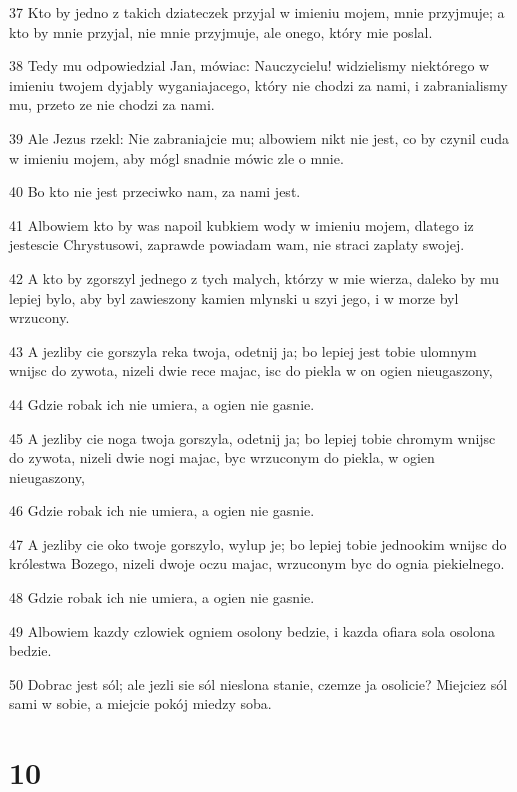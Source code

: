 \par 37 Kto by jedno z takich dziateczek przyjal w imieniu mojem, mnie przyjmuje; a kto by mnie przyjal, nie mnie przyjmuje, ale onego, który mie poslal.
\par 38 Tedy mu odpowiedzial Jan, mówiac: Nauczycielu! widzielismy niektórego w imieniu twojem dyjably wyganiajacego, który nie chodzi za nami, i zabranialismy mu, przeto ze nie chodzi za nami.
\par 39 Ale Jezus rzekl: Nie zabraniajcie mu; albowiem nikt nie jest, co by czynil cuda w imieniu mojem, aby mógl snadnie mówic zle o mnie.
\par 40 Bo kto nie jest przeciwko nam, za nami jest.
\par 41 Albowiem kto by was napoil kubkiem wody w imieniu mojem, dlatego iz jestescie Chrystusowi, zaprawde powiadam wam, nie straci zaplaty swojej.
\par 42 A kto by zgorszyl jednego z tych malych, którzy w mie wierza, daleko by mu lepiej bylo, aby byl zawieszony kamien mlynski u szyi jego, i w morze byl wrzucony.
\par 43 A jezliby cie gorszyla reka twoja, odetnij ja; bo lepiej jest tobie ulomnym wnijsc do zywota, nizeli dwie rece majac, isc do piekla w on ogien nieugaszony,
\par 44 Gdzie robak ich nie umiera, a ogien nie gasnie.
\par 45 A jezliby cie noga twoja gorszyla, odetnij ja; bo lepiej tobie chromym wnijsc do zywota, nizeli dwie nogi majac, byc wrzuconym do piekla, w ogien nieugaszony,
\par 46 Gdzie robak ich nie umiera, a ogien nie gasnie.
\par 47 A jezliby cie oko twoje gorszylo, wylup je; bo lepiej tobie jednookim wnijsc do królestwa Bozego, nizeli dwoje oczu majac, wrzuconym byc do ognia piekielnego.
\par 48 Gdzie robak ich nie umiera, a ogien nie gasnie.
\par 49 Albowiem kazdy czlowiek ogniem osolony bedzie, i kazda ofiara sola osolona bedzie.
\par 50 Dobrac jest sól; ale jezli sie sól nieslona stanie, czemze ja osolicie? Miejciez sól sami w sobie, a miejcie pokój miedzy soba.

\chapter{10}

